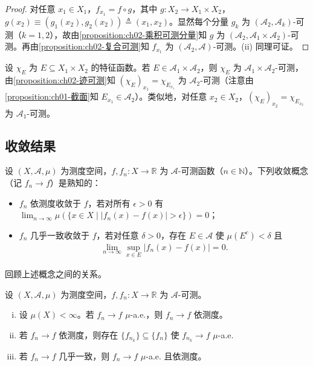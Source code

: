 \documentclass[../../main.tex]{subfiles}%
\begin{document}
\begin{proof}
对任意 $x_1\in X_1$，$f_{x_1}=f\circ g$，其中 $g:X_2\to X_1\times X_2$，$g(x_2)\equiv(g_1(x_2),g_2(x_2))\triangleq (x_1,x_2)$。显然每个分量 $g_k$ 为 $(\mathscr A_2,\mathscr A_k)$-可测（$k=1,2$），故由\cref{proposition:ch02-乘积可测分量}知 $g$ 为 $(\mathscr A_2,\mathscr A_1\times\mathscr A_2)$-可测。再由\cref{proposition:ch02-复合可测}知 $f_{x_1}$ 为 $(\mathscr A_2,\mathscr A)$-可测。(ii) 同理可证。
\end{proof}

\begin{remark}\label{remark:ch02-截面可测}
\label{remark:ch02-截口可测}
设 $\chi_E$ 为 $E\subseteq X_1\times X_2$ 的特征函数。若 $E\in\mathscr A_1\times\mathscr A_2$，则 $\chi_E$ 为 $\mathscr A_1\times\mathscr A_2$-可测，由\cref{proposition:ch02-迹可测}知 $(\chi_E)_{x_1}=\chi_{E_{x_1}}$ 为 $\mathscr A_2$-可测（注意由\cref{proposition:ch01-截面}知 $E_{x_1}\in\mathscr A_2$）。类似地，对任意 $x_2\in X_2$，$(\chi_E)_{x_2}=\chi_{E_{x_2}}$ 为 $\mathscr A_1$-可测。
\end{remark}

\subsection{收敛结果}\label{subsection:ch02-收敛结果}

设 $(X,\mathscr A,\mu)$ 为测度空间，$f,f_n:X\to\mathbb R$ 为 $\mathscr A$-可测函数（$n\in\mathbb N$）。下列收敛概念（记 $f_n\to f$）是熟知的：
\begin{itemize}
\item $f_n$ 依测度收敛于 $f$，若对所有 $\epsilon>0$ 有 $\lim_{n\to\infty}\mu(\{x\in X\mid|f_n(x)-f(x)|>\epsilon\})=0$；
\item $f_n$ 几乎一致收敛于 $f$，若对任意 $\delta>0$，存在 $E\in\mathscr A$ 使 $\mu(E^c)<\delta$ 且
\begin{align}
\lim_{n\to\infty}\sup_{x\in E}|f_n(x)-f(x)|=0. \label{align:ch02-2.3}
\end{align}
\end{itemize}

回顾上述概念之间的关系。

\begin{proposition}\label{proposition:ch02-收敛关系}
设 $(X,\mathscr A,\mu)$ 为测度空间，$f,f_n:X\to\mathbb R$ 为 $\mathscr A$-可测。
\begin{enumerate}[(i)]
\item 设 $\mu(X)<\infty$。若 $f_n\to f$ $\mu$-a.e.，则 $f_n\to f$ 依测度。
\item 若 $f_n\to f$ 依测度，则存在 $\{f_{n_k}\}\subseteq\{f_n\}$ 使 $f_{n_k}\to f$ $\mu$-a.e.
\item 若 $f_n\to f$ 几乎一致，则 $f_n\to f$ $\mu$-a.e. 且依测度。
\end{enumerate}
\end{proposition}
\end{document}
